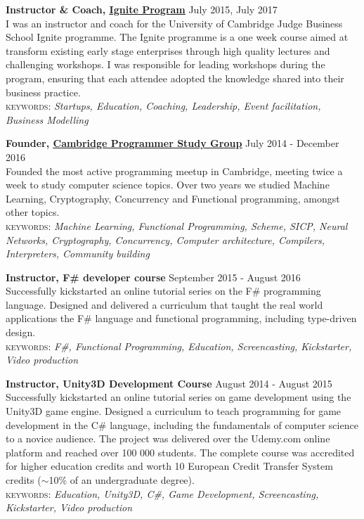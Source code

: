 \documentclass[10pt]{article}
\newcommand{\linkto}[2]{\href{#1}{\color{darkblue}\setulcolor{darkblue}\ul{#2}}}
\newcommand{\blankline}{\quad\pagebreak[2]}
\begin{document}
\blankline

\textbf{Instructor \& Coach, \linkto{https://www.jbs.cam.ac.uk/entrepreneurship/programmes/ignite/}{Ignite Program} }  \hfill July 2015, July 2017\\
I was an instructor and coach for the University of Cambridge Judge Business School Ignite programme. The Ignite programme is a one week course aimed at transform existing early stage enterprises through high quality lectures and challenging workshops. I was responsible for leading workshops during the program, ensuring that each attendee adopted the knowledge shared into their business practice.\\
{\small \textsc{keywords:} \emph{Startups, Education, Coaching, Leadership, Event facilitation, Business Modelling}}

\blankline

\textbf{Founder, \linkto{https://www.meetup.com/Cambridge-Programmers-Study-Group/}{Cambridge Programmer Study Group}}  \hfill July 2014 - December 2016\\
Founded the most active programming meetup in Cambridge, meeting twice a week to study computer science topics. Over two years we studied Machine Learning, Cryptography, Concurrency and Functional programming, amongst other topics.\\
{\small \textsc{keywords:} \emph{Machine Learning, Functional Programming, Scheme, SICP, Neural Networks, Cryptography, Concurrency, Computer architecture, Compilers, Interpreters, Community building}}

\blankline

\textbf{Instructor, F\# developer course}  \hfill September 2015 - August 2016\\
Successfully kickstarted an online tutorial series on the F\# programming language. Designed and delivered a curriculum that taught the real world applications the F\# language and functional programming, including type-driven design.\\
{\small \textsc{keywords:} \emph{F\#, Functional Programming, Education, Screencasting, Kickstarter, Video production}}

\blankline

\textbf{Instructor, Unity3D Development Course}  \hfill August 2014 - August 2015 \\
Successfully kickstarted an online tutorial series on game development using the Unity3D game engine. Designed a curriculum to teach programming for game development in the C\# language, including the fundamentals of computer science to a novice audience. The project was delivered over the Udemy.com online platform and reached over 100 000 students. The complete course was accredited for higher education credits and worth 10 European Credit Transfer System credits ($\sim$10\% of an undergraduate degree).\\
{\small \textsc{keywords:} \emph{Education, Unity3D, C\#, Game Development, Screencasting, Kickstarter, Video production}}
\end{document}
